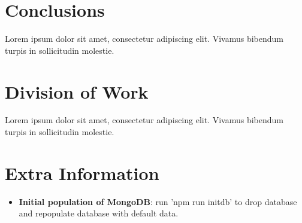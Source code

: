 \documentclass[11pt, a4paper]{article}
\begin{document}
\section{Conclusions}
Lorem ipsum dolor sit amet, consectetur adipiscing elit. Vivamus bibendum turpis in sollicitudin
molestie.

\section{Division of Work}
Lorem ipsum dolor sit amet, consectetur adipiscing elit. Vivamus bibendum turpis in sollicitudin
molestie.

\section{Extra Information}
\begin{itemize}
  \item \textbf{Initial population of MongoDB}: run 'npm run initdb' to drop database and
  repopulate database with default data.
\end{itemize}

\printbibliography
\end{document}
